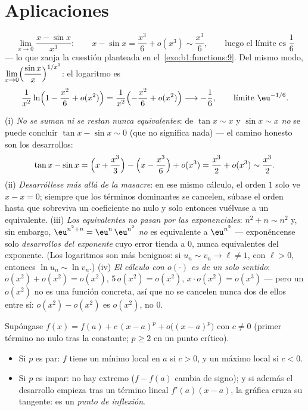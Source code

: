 \section{Aplicaciones}

\begin{example}[Límites]\label{ex:b1:taylor:limits}
\[
\lim_{x \to 0} \frac{x - \sin x}{x^3}:
\qquad
x - \sin x = \frac{x^3}{6} + o(x^3) \sim \frac{x^3}{6},
\qquad\text{luego el límite es } \frac16
\]
--- lo que zanja la cuestión planteada en
el~\cref{exo:b1:functions:9}. Del mismo modo,
$\displaystyle\lim_{x\to0}\Bigl(\frac{\sin x}{x}\Bigr)^{1/x^2}$: el
logaritmo es
\[
\frac{1}{x^2}\ln\Bigl(1 - \frac{x^2}{6} + o(x^2)\Bigr)
= \frac{1}{x^2}\Bigl(-\frac{x^2}{6} + o(x^2)\Bigr)
\longrightarrow -\frac16,
\qquad\text{límite } \eu^{-1/6}.
\]
\end{example}

\begin{remark}
(i) \emph{No se suman ni se restan nunca equivalentes}: de
$\tan x \sim x$ y $\sin x \sim x$ \emph{no} se puede concluir
$\tan x - \sin x \sim 0$ (que no significa nada) --- el camino
honesto son los desarrollos:
\[
\tan x - \sin x
= \Bigl(x + \frac{x^3}{3}\Bigr) - \Bigl(x - \frac{x^3}{6}\Bigr)
+ o(x^3) = \frac{x^3}{2} + o(x^3) \sim \frac{x^3}{2} .
\]
(ii) \emph{Desarróllese más allá de la masacre}: en ese mismo
cálculo, el orden $1$ solo ve $x - x = 0$; siempre que los términos
dominantes se cancelen, súbase el orden hasta que sobreviva un
coeficiente no nulo y solo entonces vuélvase a un equivalente.
(iii) \emph{Los equivalentes no pasan por las exponenciales}:
$n^2 + n \sim n^2$ y, sin embargo, $\eu^{n^2+n} = \eu^{n}\,\eu^{n^2}$
\emph{no} es equivalente a $\eu^{n^2}$ --- exponéncense solo
\emph{desarrollos del exponente} cuyo error tienda a $0$, nunca
equivalentes del exponente. (Los logaritmos son más benignos: si
$u_n \sim v_n \to \ell \neq 1$, con $\ell > 0$, entonces
$\ln u_n \sim \ln v_n$.) (iv) \emph{El cálculo con $o(\cdot)$ es de
un solo sentido}: $o(x^2) + o(x^2) = o(x^2)$, $5\,o(x^2) = o(x^2)$,
$x\cdot o(x^2) = o(x^3)$ --- pero un $o(x^2)$ no es una función
concreta, así que no se cancelen nunca dos de ellos entre sí:
$o(x^2) - o(x^2)$ es $o(x^2)$, no $0$.
\end{remark}

\begin{proposition}\label{prop:b1:taylor:local}
Supóngase $f(x) = f(a) + c\,(x - a)^p + o\bigl((x-a)^p\bigr)$ con
$c \neq 0$ (primer término no nulo tras la constante; $p \geq 2$ en
un punto crítico).
\begin{itemize}
  \item Si $p$ es par: $f$ tiene un mínimo local en $a$ si $c > 0$, y
        un máximo local si $c < 0$.
  \item Si $p$ es impar: no hay extremo ($f - f(a)$ cambia de signo);
        y si además el desarrollo empieza tras un término lineal
        $f'(a)(x - a)$, la gráfica cruza su tangente: es un
        \emph{punto de inflexión}.
\end{itemize}
\end{proposition}

